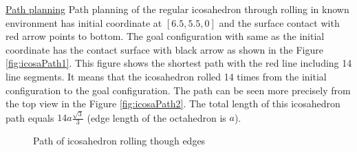 %
%
\noindent\uline{Path planning} 
Path planning of the regular icosahedron through rolling in known environment has initial coordinate at $[6.5, 5.5, 0]$ and the surface contact with red arrow points to bottom. 
The goal configuration with same as the initial coordinate has the contact surface with black arrow as shown in the Figure \ref{fig:icosaPath1}. 
This figure shows the shortest path with the red line including 14 line segments. 
It means that the icosahedron rolled 14 times from the initial configuration to the goal configuration. 
The path can be seen more precisely from the top view in the Figure \ref{fig:icosaPath2}.
The total length of this icosahedron path equals $14a\frac{\sqrt{3}}{3}$ (edge length of the octahedron is $a$).

\begin{center}
\begin{figure}[h]
\hfill
{}
\caption{Path of icosahedron rolling though edges}
\label{fig:icosaPaths}
\end{figure}
\end{center}
%
%
%
\clearpage
\newpage
